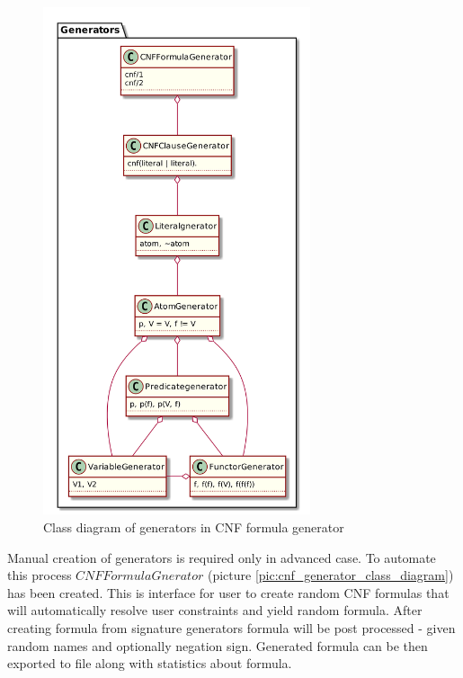 \begin{figure}[h]
\begin{centering}
  \includegraphics[width=0.7\textwidth]{logic-formula-generator/fol/cnf_signature_generators.png}
  \caption{Class diagram of generators in CNF formula generator}
  \label{pic:fol_signature_generator_class_diagram}
\end{centering}
\end{figure}

Manual creation of generators is required only in advanced case. To automate this process $CNFFormulaGnerator$ (picture \ref{pic:cnf_generator_class_diagram}) has been created. This is interface for user to create random CNF formulas that will automatically resolve user constraints and yield random formula. After creating formula from signature generators formula will be post processed - given random names and optionally negation sign. Generated formula can be then exported to file along with statistics about formula.

